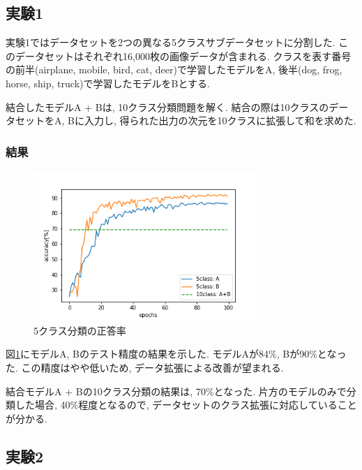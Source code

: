 \documentclass[twocolumn]{jarticle}     %
\begin{document}
\subsection{実験1}


実験1ではデータセットを2つの異なる5クラスサブデータセットに分割した.
このデータセットはそれぞれ16,000枚の画像データが含まれる.
クラスを表す番号の前半(airplane, mobile, bird, cat, deer)で学習したモデルをA,
後半(dog, frog, horse, ship, truck)で学習したモデルをBとする.

結合したモデルA + Bは, 10クラス分類問題を解く.
結合の際は10クラスのデータセットをA, Bに入力し, 得られた出力の次元を10クラスに拡張して和を求めた.

\subsubsection{結果}

\begin{figure}[tb]
	\begin{center}
		\includegraphics[clip,width=8.5cm]{accuracy5.png}
		\caption{5クラス分類の正答率}
		\label{fig:accuracy5}
	\end{center}
\end{figure}

図\ref{fig:accuracy5}にモデルA, Bのテスト精度の結果を示した.
モデルAが84\%, Bが90\%となった. この精度はやや低いため, データ拡張による改善が望まれる.

結合モデルA + Bの10クラス分類の結果は, 70\%となった.
片方のモデルのみで分類した場合, 40\%程度となるので, データセットのクラス拡張に対応していることが分かる.

\subsection{実験2}
\end{document}
